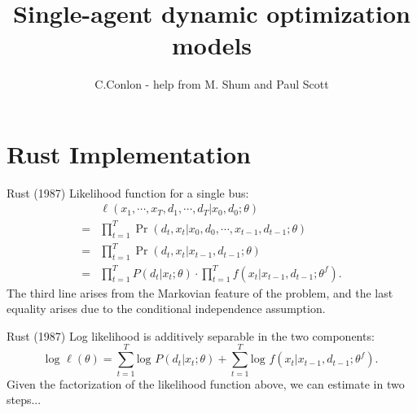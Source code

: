 \documentclass[aspectratio=169,11pt]{beamer}
\title [Single-agent dynamic optimization models]{Single-agent dynamic optimization models}
\author{C.Conlon - help from M. Shum and Paul Scott}
\institute{Grad IO }
\date{}
\begin{document}
\begin{frame}
\titlepage
\end{frame}

\section{Rust Implementation}

\begin{frame}{Rust (1987)}
Likelihood function for a single bus:
\begin{equation*}
\begin{split}
& \ell (x_1, \cdots , x_T, d_1, \cdots , d_T | x_0, d_0 ; \theta) \\
= & \prod^T_{t=1} \Pr(d_t, x_t | x_0, d_0, \cdots , x_{t-1}, d_{t-1} ; \theta) \\
= & \prod^T_{t=1} \Pr(d_t, x_t |  x_{t-1}, d_{t-1} ; \theta) \\
= & \prod^T_{t=1} P(d_t | x_t; \theta) \cdot \prod^T_{t=1} f (x_t | x_{t-1}, d_{t-1} ; \theta^f) .
\end{split}
\end{equation*}
The third line arises from the Markovian feature of the problem, and the last equality arises due to the conditional independence assumption.
\end{frame}

\begin{frame}{Rust (1987)}
Log likelihood is additively separable in the two components:
\begin{equation*}
\text{log } \ell(\theta) = \sum^T_{t=1} \text{log } P (d_t | x_t ; \theta) + \sum^T_{t=1} \text{log } f (x_t | x_{t-1}, d_{t-1}; \theta^f).
\end{equation*}
Given the factorization of the likelihood function above, we can estimate in two steps... \\
\vspace{3mm}
\end{frame}
\end{document}
